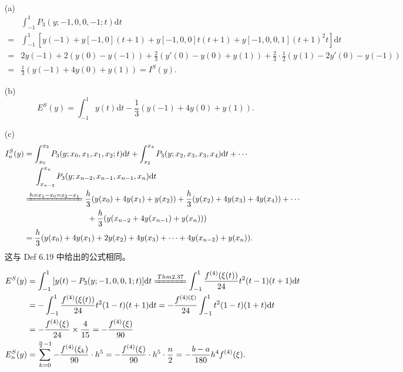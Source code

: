 \documentclass[lang=cn,a4paper,newtx,bibend=bibtex]{elegantpaper}
\newcommand{\longeq}[2]{\xlongequal[#2]{#1}}
\newcommand{\dd}{\mathrm{d}}
\newcommand{\bigsum}[2]{\sum\limits_{#1}^{#2}}
\newcommand{\Int}[4]{\int_{#1}^{#2}{#3}{\dd {#4}}}
\begin{document}
\begin{solution}~~

  \begin{enumerate}
    \item[(a)]
    \begin{equation*}
    \begin{aligned}
    &\Int{-1}{1}{P_3(y; -1, 0, 0, -1; t)}{t} \\
    =& \Int{-1}{1}{\left[y(-1)+y[-1, 0](t+1) + y[-1, 0, 0]t(t+1) + y[-1, 0, 0, 1](t+1)^2t\right]}{t} \\
    =& 2y(-1)+2\left(y(0) - y(-1)\right) +\frac23 \left(y'(0)-y(0)+y(1)\right) + \frac23\cdot\frac12 \left(y(1)-2y'(0)-y(-1)\right) \\
    =& \frac13 \left(y(-1)+4y(0)+y(1)\right) = I^S(y).
    \end{aligned} 
    \end{equation*}
    \item[(b)]
    \[E^S(y) = \Int{-1}{1}{y(t)}{t} - \frac13 \left(y(-1) + 4y(0) + y(1)\right).\]
    \item[(c)]  
    \begin{equation*}
    \begin{aligned}
      I_n^S(y) &= \Int{x_0}{x_2}{P_3(y; x_0, x_1, x_1, x_2; t)}{t} + \Int{x_2}{x_4}{P_3(y; x_2, x_3, x_3, x_4)}{t} + \cdots \\
      &~~~~ \Int{x_{n-2}}{x_n}{P_3(y; x_{n-2}, x_{n-1}, x_{n-1}, x_n)}{t} \\
      &\longeq{h = x_1 - x_0 = x_2 - x_1}{} \frac{h}3 (y(x_0) + 4y(x_1) + y(x_2)) + \frac{h}3 (y(x_2)+4y(x_3)+4y(x_4)) + \cdots \\
      &~~~~~~~~~~~~~~~~~~~~~~~~+ \frac{h}3 (y(x_{n-2}+4y(x_{n-1})+y(x_n))) \\
      &= \frac{h}3 (y(x_0) + 4y(x_1) + 2y(x_2) + 4y(x_3) + \cdots + 4y(x_{n-2}) + y(x_n)).
    \end{aligned}
    \end{equation*}
    这与 Def 6.19 中给出的公式相同。

    \begin{equation*}
    \begin{aligned}
      E^S(y) &= \Int{-1}{1}{\left[y(t)-P_3(y;-1,0,0,1;t)\right]}{t} 
      \longeq{Thm 2.37}{} \Int{-1}{1}{\dfrac{f^{(4)}(\xi(t))}{24}t^2(t-1)(t+1)}{t}
      \\&= -\Int{-1}{1}{
        \dfrac{f^{(4)}(\xi(t))}{24} t^2(1-t)(t+1)
      }{t} = -\dfrac{f^{(4)(\xi)}}{24} \Int{-1}{1}{t^2(1-t)(1+t)}{t}\\
      &= -\dfrac{f^{(4)}(\xi)}{24} \times \dfrac4{15} = -\dfrac{f^{(4)}(\xi)}{90} \\
      E_n^S(y) &= \bigsum{k = 0}{\frac{n}2 - 1} - \dfrac{f^{(4)}(\xi_k)}{90}\cdot h^5 = -\dfrac{f^{(4)}(\xi)}{90}\cdot h^5 \cdot \frac{n}2 = - \dfrac{b - a}{180} h^4 f^{(4)}(\xi).
    \end{aligned}
    \end{equation*}
  \end{enumerate}
\end{solution}
\end{document}

